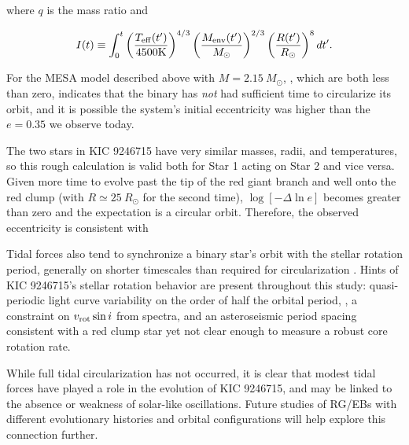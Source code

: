 \noindent where $q$ is the mass ratio and

\begin{equation}
I(t) \equiv \int_0^t \left( \frac{T_{\rm{eff}}(t')}{4500 \rm{K}} \right)^{4/3} \left( \frac{M_{\rm{env}}(t')}{M_{\odot}} \right)^{2/3} \left( \frac{R(t')}{R_{\odot}} \right)^8 dt'. \nonumber
\end{equation}

For the MESA model described above with $M = 2.15 \ M_{\odot}$, , which are both less than zero, indicates that the binary has \emph{not} had sufficient time to circularize its orbit, and it is possible the system's initial eccentricity was higher than the $e = 0.35$ we observe today.

The two stars in KIC 9246715 have very similar masses, radii, and temperatures, so this rough calculation is valid both for Star 1 acting on Star 2 and vice versa. Given more time to evolve past the tip of the red giant branch and well onto the red clump (with $R \simeq 25 \ R_\odot$ for the second time), $\log [-\Delta \ln e]$ becomes greater than zero and the expectation is a circular orbit. Therefore, the observed eccentricity is consistent with 

Tidal forces also tend to synchronize a binary star's orbit with the stellar rotation period, generally on shorter timescales than required for circularization \citep{ogi14}. Hints of KIC 9246715's stellar rotation behavior are present throughout this study: quasi-periodic light curve variability on the order of half the orbital period, , a constraint on $v_{\rm{rot}} \sin i$ from spectra, and an asteroseismic period spacing consistent with a red clump star yet not clear enough to measure a robust core rotation rate.

While full tidal circularization has not occurred, it is clear that modest tidal forces have played a role in the evolution of KIC 9246715, and may be linked to the absence or weakness of solar-like oscillations. Future studies of RG/EBs with different evolutionary histories and orbital configurations will help explore this connection further.

  
  